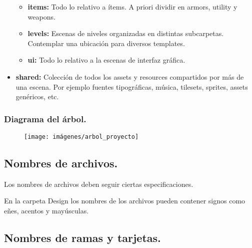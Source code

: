 \begin{itemize}
\begin{itemize}
	\item \textbf{items:} Todo lo relativo a ítems. A priori dividir en armors, utility y weapons.

	\item \textbf{levels:} Escenas de niveles organizadas en distintas subcarpetas. Contemplar una ubicación para diversos templates.

	\item \textbf{ui:} Todo lo relativo a la escenas de interfaz gráfica.
\end{itemize}

\item \textbf{shared:} Colección de todos los assets y resources compartidos por más de una escena. Por ejemplo fuentes tipográficas, música, tilesets, sprites, assets genéricos, etc.
\end{itemize}

\subsubsection*{Diagrama del árbol.}
\begin{figure}[H]
\centering
\texttt{[image: imágenes/arbol\_proyecto]}
\label{fig:arbolproyecto}
\end{figure}

\subsection{Nombres de archivos.}\label{organizacion:nombres-de-archivos}
Los nombres de archivos deben seguir ciertas especificaciones.

En la carpeta Design los nombres de los archivos pueden contener signos como eñes, acentos y mayúsculas.

\subsection{Nombres de ramas y tarjetas.}\label{organizacion:nombres-de-ramas}